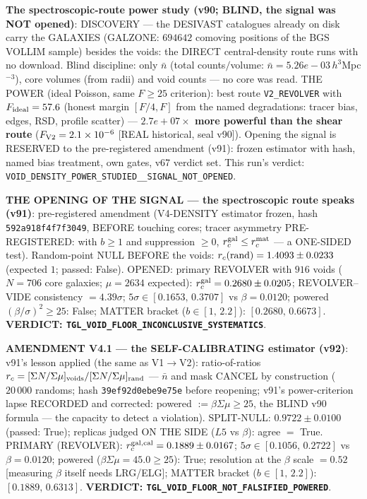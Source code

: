 \documentclass[11pt]{article}
\theoremstyle{definition}\newtheorem{deriv}{Derivation}
\begin{document}
\textbf{The spectroscopic-route power study (v90; BLIND, the signal was NOT opened)}: DISCOVERY --- the DESIVAST catalogues already on disk carry the GALAXIES (GALZONE: $694642$ comoving positions of the BGS VOLLIM sample) besides the voids: the DIRECT central-density route runs with no download. Blind discipline: only $\bar n$ (total counts$/$volume: $\bar n=5.26e-03\,h^3$Mpc$^{-3}$), core volumes (from radii) and void counts --- no core was read. THE POWER (ideal Poisson, same $F\ge25$ criterion): best route \texttt{V2\_REVOLVER} with $F_{\rm ideal}=57.6$ (honest margin $[F/4,F]$ from the named degradations: tracer bias, edges, RSD, profile scatter) --- \textbf{$2.7e+07\times$ more powerful than the shear route} ($F_{\rm V2}=2.1\times10^{-6}$ [REAL historical, seal v90]). Opening the signal is RESERVED to the pre-registered amendment (v91): frozen estimator with hash, named bias treatment, own gates, v67 verdict set. This run's verdict: \texttt{VOID\_DENSITY\_POWER\_STUDIED\_\_SIGNAL\_NOT\_OPENED}.

\textbf{THE OPENING OF THE SIGNAL --- the spectroscopic route speaks (v91)}: pre-registered amendment (V4-DENSITY estimator frozen, hash \texttt{592a918f4f7f3049}, BEFORE touching cores; tracer asymmetry PRE-REGISTERED: with $b\ge1$ and suppression $\ge0$, $r_c^{\rm gal}\le r_c^{\rm mat}$ --- a ONE-SIDED test). Random-point NULL BEFORE the voids: $r_c({\rm rand})=1.4093\pm0.0233$ (expected $1$; passed: False). OPENED: primary REVOLVER with $916$ voids ($N=706$ core galaxies; $\mu=2634$ expected): $r_c^{\rm gal}=0.2680\pm0.0205$; REVOLVER--VIDE consistency $=4.39\sigma$; $5\sigma\in[0.1653,\,0.3707]$ vs $\beta=0.0120$; powered $(\beta/\sigma)^2\ge25$: False; MATTER bracket ($b\in[1,\,2.2]$): $[0.2680,\,0.6673]$. \textbf{VERDICT: \texttt{TGL\_VOID\_FLOOR\_INCONCLUSIVE\_SYSTEMATICS}}.

\textbf{AMENDMENT V4.1 --- the SELF-CALIBRATING estimator (v92)}: v91's lesson applied (the same as V1$\to$V2): ratio-of-ratios $r_c=[\Sigma N/\Sigma\mu]_{\rm voids}/[\Sigma N/\Sigma\mu]_{\rm rand}$ --- $\bar n$ and mask CANCEL by construction ($20\,000$ randoms; hash \texttt{39ef92d0ebe9e75e} before reopening; v91's power-criterion lapse RECORDED and corrected: powered $:=\beta\Sigma\mu\ge25$, the BLIND v90 formula --- the capacity to detect a violation). SPLIT-NULL: $0.9722\pm0.0100$ (passed: True); replicas judged ON THE SIDE ($L5$ vs $\beta$): agree $=$ True. PRIMARY (REVOLVER): $r_c^{\rm gal,cal}=0.1889\pm0.0167$; $5\sigma\in[0.1056,\,0.2722]$ vs $\beta=0.0120$; powered ($\beta\Sigma\mu=45.0\ge25$): True; resolution at the $\beta$ scale $=0.52$ [measuring $\beta$ itself needs LRG/ELG]; MATTER bracket ($b\in[1,\,2.2]$): $[0.1889,\,0.6313]$. \textbf{VERDICT: \texttt{TGL\_VOID\_FLOOR\_NOT\_FALSIFIED\_POWERED}}.
\end{document}
